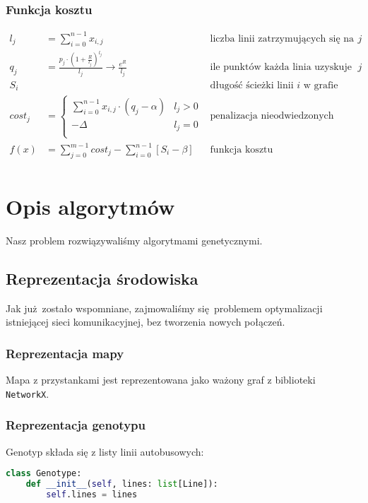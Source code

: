 \documentclass[12pt,a4paper,openright]{mwrep}
\begin{document}
\subsection{Funkcja kosztu}
\begin{align*}
	l_j &= \sum_{i=0}^{n-1} x_{i, j}&\text{liczba linii zatrzymujących się na przystanku $j$}\\
	q_j &= \frac{p_j \cdot (1+\frac{R}{l_j})^{l_j}}{l_j} \xrightarrow{} \frac{e^R}{l_j} &\text{ile punktów każda linia uzyskuje z przystanku $j$}\\
	S_{i}&&\text{długość ścieżki linii $i$ w grafie}\\
	cost_{j} &= \begin{cases}
		\sum_{i=0}^{n-1} x_{i,j} \cdot (q_j-\alpha) & l_j > 0\\
		-\Delta & l_j = 0\\
	\end{cases} & \text{penalizacja nieodwiedzonych przystanków}\\
	f(x) &= \sum_{j=0}^{m-1} cost_{j} - \sum_{i=0}^{n-1} \left[ S_{i}-\beta \right] &\text{funkcja kosztu}\\
\end{align*}







\chapter{Opis algorytmów}
Nasz problem rozwiązywaliśmy algorytmami genetycznymi.

\section{Reprezentacja środowiska}
Jak już zostało wspomniane, zajmowaliśmy się problemem optymalizacji istniejącej sieci komunikacyjnej, bez tworzenia nowych połączeń.

\subsection{Reprezentacja mapy}
Mapa z przystankami jest reprezentowana jako ważony graf z biblioteki \lstinline{NetworkX}.

\subsection{Reprezentacja genotypu}
Genotyp składa się z listy linii autobusowych:
\begin{lstlisting}[language=Python]
class Genotype:
    def __init__(self, lines: list[Line]):
        self.lines = lines
\end{lstlisting}
\end{document}
